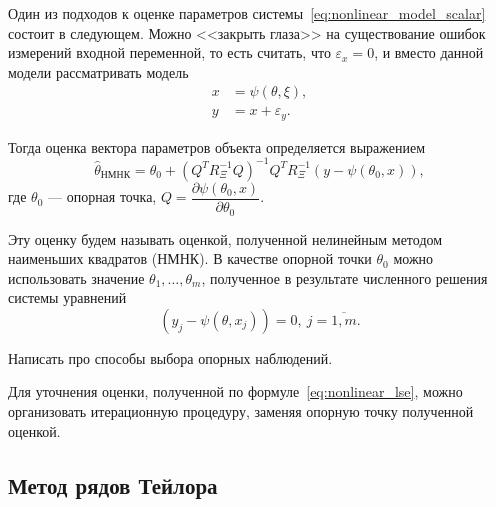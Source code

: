 Один из подходов к оценке параметров системы~\eqref{eq:nonlinear_model_scalar} состоит в следующем.
Можно <<закрыть глаза>> на существование ошибок измерений
входной переменной, то есть считать, что \( \varepsilon_x = 0 \),
и вместо данной модели рассматривать модель
\begin{equation}
  \label{eq:nonlinear_model_lse}
  \begin{aligned}
  x &= \psi(\theta, \xi), \\
  y &= x + \varepsilon_y.
  \end{aligned}
\end{equation}

Тогда оценка вектора параметров объекта определяется выражением~\cite{mukha_2009}
\begin{equation}
  \label{eq:nonlinear_lse}
  \hat{\theta}_{\text{НМНК}} =
  \theta_0 + (Q^T R^{-1}_{\Xi} Q)^{-1} Q^T R^{-1}_{\Xi} (y - \psi(\theta_0, x)),
\end{equation}
где \( \theta_0 \) --- опорная точка,
\( Q = \dfrac{\partial \psi(\theta_0, x) }{ \partial \theta_0 } \).

Эту оценку будем называть оценкой, полученной нелинейным
методом наименьших квадратов (НМНК).
В качестве опорной точки \( \theta_0 \) можно использовать значение
\( \theta_1, \dotsc, \theta_m \),
полученное в результате численного решения системы уравнений
\begin{equation}
  \label{eq:nonlinear_basic}
  (y_j - \psi( \theta, x_j )) = 0, \: j = \overline{1,m}.
\end{equation}

{\color{red} Написать про способы выбора опорных наблюдений}.

Для уточнения оценки, полученной по формуле~\eqref{eq:nonlinear_lse}, можно
организовать итерационную процедуру, заменяя опорную точку полученной оценкой.

\vspace{2\baselineskip}
\subsection{Метод рядов Тейлора}

